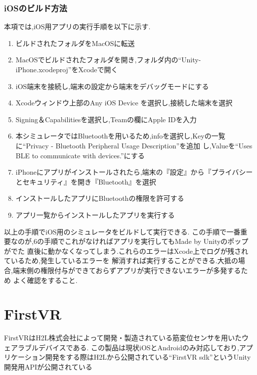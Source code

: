 \documentclass{ltjsreport}
\begin{document}
			\subsubsection{iOSのビルド方法}
				本項では,iOS用アプリの実行手順を以下に示す.
				\begin{enumerate}
					\item ビルドされたフォルダをMacOSに転送
					\item MacOSでビルドされたフォルダを開き,フォルダ内の``Unity-iPhone.xcodeproj''をXcodeで開く
					\item iOS端末を接続し,端末の設定から端末をデバッグモードにする
					\item Xcodeウィンドウ上部のAny iOS Device を選択し,接続した端末を選択
					\item Signing＆Capabilitiesを選択し,Teamの欄にApple IDを入力
					\item 本シミュレータではBluetoothを用いるため,infoを選択し,Keyの一覧に``Privacy - Bluetooth Peripheral Usage Description''を追加
						し,Valueを``Uses BLE to communicate with devices.''にする
					\item iPhoneにアプリがインストールされたら,端末の『設定』から『プライバシーとセキュリティ』を開き『Bluetooth』を選択
					\item インストールしたアプリにBluetoothの権限を許可する
					\item アプリ一覧からインストールしたアプリを実行する
				\end{enumerate}
				以上の手順でiOS用のシミュレータをビルドして実行できる.
				この手順で一番重要なのが,6の手順でこれがなければアプリを実行してもMade by Unityのポップがでた
				直後に動かなくなってしまう.これらのエラーはXcode上でログが残されているため,発生しているエラーを
				解消すれば実行することができる.大抵の場合,端末側の権限付与ができておらずアプリが実行できないエラーが多発するため
				よく確認をすること.
	\section{FirstVR}
		FirstVRはH2L株式会社\cite{ref:5}によって開発・製造されている筋変位センサを用いたウェアラブルデバイスである.
		この製品は現状iOSとAndroidのみ対応しており,アプリケーション開発をする際はH2Lから公開されている``FirstVR sdk''というUnity開発用APIが公開されている
\end{document}
